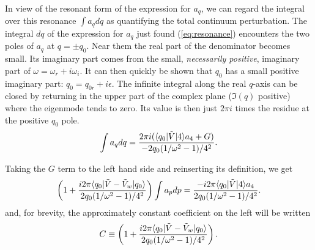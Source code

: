 \documentclass[12pt]{article}
\def\ket#1{|#1\rangle}
\def\bra#1{\langle#1}
\begin{document}
In view of the resonant form of the expression for $a_q$, we can regard the
integral over this resonance $\int a_q dq$ as quantifying the total
continuum perturbation.  The integral $dq$ of the expression for $a_q$
just found (\ref{eq:resonance}) encounters the two poles of $a_q$ at
$q=\pm q_0$.
Near them the real part of the denominator becomes small. Its
imaginary part comes from the small, \emph{necessarily positive},
imaginary part of
$\omega=\omega_r+i\omega_i$. It can then quickly be shown that
$q_0$ has a small positive imaginary part: $q_0=q_{0r}+i\epsilon$.
\iftrue%
The infinite integral along the real
$q$-axis can be closed by returning in the upper part of the complex
plane ($\Im(q)$ positive) where the eigenmode tends
to zero. Its value is then just $2\pi i$ times the residue at the positive $q_0$ pole.
\begin{equation}
  \label{poles}
  \int a_q dq 
  ={2\pi i(\bra{q_0}|\tilde{V}\ket{4}a_4+G)
    \over
    -2q_{0}(1/\omega^2-1)/4^2}.
\end{equation}
\else
A resonant integral for small positive
$\epsilon$ and real $q$ generally gives
\begin{equation}
  \label{resint}
  \int_{-}^{+} {g(q) dq\over \pm q_{0r} \pm i\epsilon-q}\simeq \mp
  i\pi g(\pm q_{0r})
\end{equation}
for any slowly varying function $g$.
On this basis
\footnote{Write the integral $\int{g(q)dq\over
  (q_{0r}+i\epsilon)^2-q^2}=\int{g(q)dq\over 
(q_{0r}+i\epsilon-q)(q_{0r}+i\epsilon+q)}\simeq \int{g(q_{0r})dq\over
  (q_{0r}+i\epsilon-q)2q_{0r}}-\int{g(-q_{0r})dq\over
  2q_{0r}(-q_{0r}-i\epsilon-q) }\simeq -i\pi [g(q_{0r})+g(-q_{0r})]/2q_{0r}. $ when
 $\epsilon$ is
positive. This treatment is equivalent to closing the $q$-integration path
along $+i\infty$ and setting the closed contour integral equal to
$2\pi i$ times only the residue at $q=q_{0r}+i\epsilon$.}
\begin{equation}
  \label{poles}
  \int a_q dq \simeq -i4\pi {(\bra{q_{0r}}|\tilde{V}\ket{4}
    +\bra{-q_{0r}}|\tilde{V}\ket{4})a_4+2G
    \over
    2q_{0r}(1/\omega^2-1)/4^2
  }
  =\sum_{q=\pm q_{0r}}{-i4\pi(\bra{q}|\tilde{V}\ket{4}a_4+G)
    \over
    2q_{0r}(1/\omega^2-1)/4^2}.
\end{equation}
\fi
Taking the $G$ term to the left hand side and reinserting its definition, we get
\begin{equation}
  \label{eq:22}
  \left(1+{i2\pi \bra{q_{0}}|\tilde{V}-\tilde{V}_{w}\ket{q_{0}}\over
      2q_{0}(1/\omega^2-1)/4^2}\right)\int a_pdp
  ={-i2\pi\bra{q_0}|\tilde{V}\ket{4}a_4
    \over
    2q_{0}(1/\omega^2-1)/4^2}.
\end{equation}
and, for brevity, the approximately constant coefficient on the left will
be written
\begin{equation}
  \label{eq:23}
  C \equiv
  \left(1+{i2\pi\bra{q_{0}}|\tilde{V}-\tilde{V}_{w}\ket{q_{0}}\over
      2q_{0}(1/\omega^2-1)/4^2}\right).
\end{equation}
\end{document}
